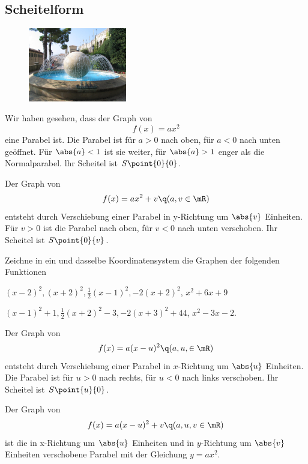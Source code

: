 \documentclass[%
11pt,%
twoside,%
titlepage,%
german,%
headsepline%
]{scrartcl}
\begin{document}
\subsection{Scheitelform}
\begin{figure}
  \begin{center}
    \includegraphics[width=0.382\textwidth]{pictures/springbrunnen}
  \end{center}
\end{figure}
Wir haben gesehen, dass der Graph von
$$f(x)=ax^2$$
eine Parabel ist. Die Parabel ist f\"ur $a>0$ nach oben, f\"ur $a<0$ nach unten ge\"offnet. F\"ur $\abs{a}<1$ ist sie weiter, f\"ur $\abs{a}>1$ enger als die Normalparabel. lhr Scheitel ist $S\point{0}{0}$.

Der
Graph von
$$f(x)=ax^2+v\q(a,v\in\mR)$$
entsteht durch Verschiebung einer Parabel in y-Richtung um $\abs{v}$ Einheiten. F\"ur $v>0$ ist die Parabel nach oben, f\"ur $v<0$ nach unten verschoben. Ihr Scheitel ist $S\point{0}{v}$.

\begin{ueb}[Graphen]
Zeichne in ein und dasselbe Koordinatensystem die Graphen
der folgenden Funktionen
\begin{enumeratea}
\item $(x-2)^2, (x+2)^2, \frac{1}{2}(x-1)^2, -2(x+2)^2$, $x^2+6x+9$
\item $(x-1)^2+1, \frac{1}{2}(x+2)^2-3, -2(x+3)^2+44$, $x^2-3x-2.$
\end{enumeratea}
\end{ueb}

Der Graph von
$$f(x)=a(x-u)^2\q(a,u,\in\mR)$$
entsteht durch Verschiebung einer Parabel in $x$-Richtung um $\abs{u}$ Einheiten. Die Parabel ist f\"ur $u>0$ nach rechts, f\"ur $u<0$ nach links verschoben. Ihr Scheitel ist $S\point{u}{0}$.

Der
Graph von
$$f(x)=a(x-u)^2+v\q(a,u,v\in\mR)$$
ist die in x-Richtung um $\abs{u}$ Einheiten und in $y$-Richtung um $\abs{v}$ Einheiten verschobene Parabel mit der Gleichung $y=ax^2$.
\end{document}
